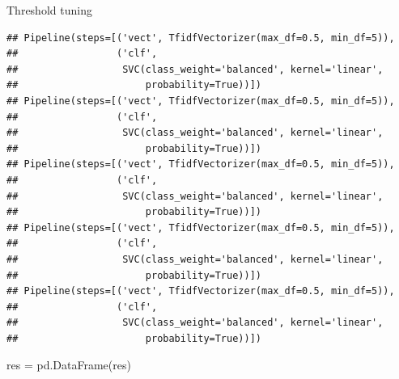 \documentclass[
  10pt,
  ignorenonframetext,
  aspectratio=169]{beamer}
\newenvironment{Shaded}{\begin{snugshade}}{\end{snugshade}}
\newcommand{\NormalTok}[1]{\textcolor[rgb]{0.80,0.80,0.80}{#1}}
\newcommand{\OperatorTok}[1]{\textcolor[rgb]{0.94,0.94,0.82}{#1}}
\begin{document}
\begin{frame}[fragile]{Threshold tuning}
\begin{verbatim}
## Pipeline(steps=[('vect', TfidfVectorizer(max_df=0.5, min_df=5)),
##                 ('clf',
##                  SVC(class_weight='balanced', kernel='linear',
##                      probability=True))])
## Pipeline(steps=[('vect', TfidfVectorizer(max_df=0.5, min_df=5)),
##                 ('clf',
##                  SVC(class_weight='balanced', kernel='linear',
##                      probability=True))])
## Pipeline(steps=[('vect', TfidfVectorizer(max_df=0.5, min_df=5)),
##                 ('clf',
##                  SVC(class_weight='balanced', kernel='linear',
##                      probability=True))])
## Pipeline(steps=[('vect', TfidfVectorizer(max_df=0.5, min_df=5)),
##                 ('clf',
##                  SVC(class_weight='balanced', kernel='linear',
##                      probability=True))])
## Pipeline(steps=[('vect', TfidfVectorizer(max_df=0.5, min_df=5)),
##                 ('clf',
##                  SVC(class_weight='balanced', kernel='linear',
##                      probability=True))])
\end{verbatim}

\begin{Shaded}
\begin{Highlighting}[]
\NormalTok{res }\OperatorTok{=}\NormalTok{ pd.DataFrame(res)}
\end{Highlighting}
\end{Shaded}
\end{frame}
\end{document}
